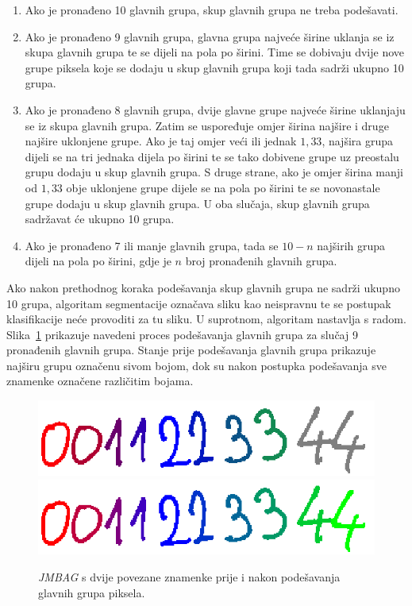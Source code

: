 \begin{enumerate}
    \item Ako je pronađeno 10 glavnih grupa, skup glavnih grupa ne treba podešavati.
    \item Ako je pronađeno 9 glavnih grupa, glavna grupa najveće širine uklanja se iz skupa glavnih grupa te se dijeli
    na pola po širini. Time se dobivaju dvije nove grupe piksela koje se dodaju u skup glavnih grupa koji tada sadrži
    ukupno 10 grupa.
    \item Ako je pronađeno 8 glavnih grupa, dvije glavne grupe najveće širine uklanjaju se iz skupa glavnih grupa.
    Zatim se uspoređuje omjer širina najšire i druge najšire uklonjene grupe. Ako je taj omjer veći ili jednak $1,33$,
    najšira grupa dijeli se na tri jednaka dijela po širini te se tako dobivene grupe uz preostalu grupu dodaju u skup
    glavnih grupa. S druge strane, ako je omjer širina manji od $1,33$ obje uklonjene grupe dijele se na pola po širini
    te se novonastale grupe dodaju u skup glavnih grupa. U oba slučaja, skup glavnih grupa sadržavat će ukupno 10 grupa.
    \item Ako je pronađeno 7 ili manje glavnih grupa, tada se $10 - n$ najširih grupa dijeli na pola po širini, gdje je
    $n$ broj pronađenih glavnih grupa.
\end{enumerate}
Ako nakon prethodnog koraka podešavanja skup glavnih grupa ne sadrži ukupno 10 grupa, algoritam segmentacije označava
sliku kao neispravnu te se postupak klasifikacije neće provoditi za tu sliku. U suprotnom, algoritam nastavlja s radom.
Slika\ \ref{fig:segmentation-division} prikazuje navedeni proces podešavanja glavnih grupa za slučaj 9 pronađenih glavnih
grupa. Stanje prije podešavanja glavnih grupa prikazuje najširu grupu označenu sivom bojom, dok su nakon postupka
podešavanja sve znamenke označene različitim bojama.\\
\begin{figure}[htb]
    \centering
    \includegraphics[width=12cm]{images/chapter4/segmentation-before-division.png}
    \includegraphics[width=12cm]{images/chapter4/segmentation-after-division.png}
    \caption{\emph{JMBAG} s dvije povezane znamenke prije i nakon podešavanja glavnih grupa piksela.}
    \label{fig:segmentation-division}
\end{figure}
